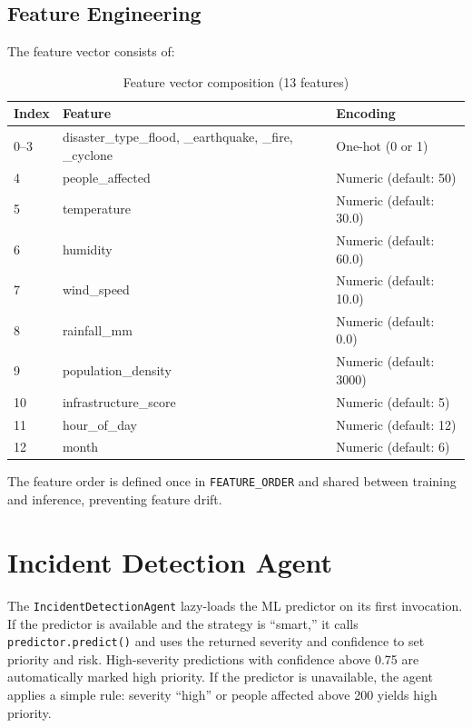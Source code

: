 \subsection{Feature Engineering}

The feature vector consists of:

\begin{table}[H]
\centering
\caption{Feature vector composition (13 features)}
\label{tab:feature_vector}
\begin{tabularx}{\textwidth}{|l|l|X|}
\hline
\textbf{Index} & \textbf{Feature} & \textbf{Encoding} \\
\hline
0--3 & disaster\_type\_flood, \_earthquake, \_fire, \_cyclone & One-hot (0 or 1) \\
\hline
4 & people\_affected & Numeric (default: 50) \\
\hline
5 & temperature & Numeric (default: 30.0) \\
\hline
6 & humidity & Numeric (default: 60.0) \\
\hline
7 & wind\_speed & Numeric (default: 10.0) \\
\hline
8 & rainfall\_mm & Numeric (default: 0.0) \\
\hline
9 & population\_density & Numeric (default: 3000) \\
\hline
10 & infrastructure\_score & Numeric (default: 5) \\
\hline
11 & hour\_of\_day & Numeric (default: 12) \\
\hline
12 & month & Numeric (default: 6) \\
\hline
\end{tabularx}
\end{table}

The feature order is defined once in \texttt{FEATURE\_ORDER} and shared between training and inference, preventing feature drift.

\section{Incident Detection Agent}
\label{sec:impl_incident_agent}

The \texttt{IncidentDetectionAgent} lazy-loads the ML predictor on its first invocation. If the predictor is available and the strategy is ``smart,'' it calls \texttt{predictor.predict()} and uses the returned severity and confidence to set priority and risk. High-severity predictions with confidence above 0.75 are automatically marked high priority. If the predictor is unavailable, the agent applies a simple rule: severity ``high'' or people affected above 200 yields high priority.

